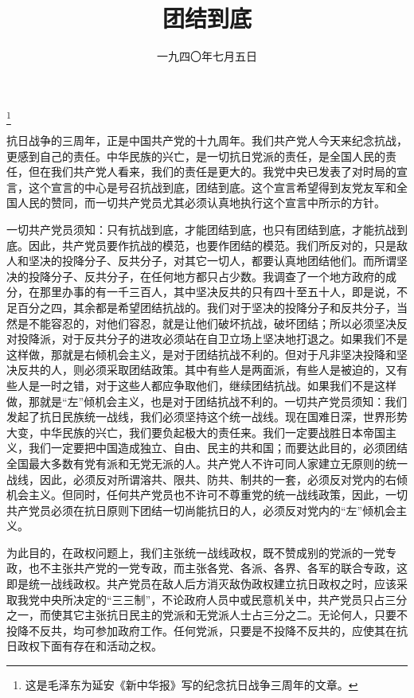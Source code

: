 
\title{团结到底}
\date{一九四〇年七月五日}
\thanks{这是毛泽东为延安《新中华报》写的纪念抗日战争三周年的文章。}
\maketitle


抗日战争的三周年，正是中国共产党的十九周年。我们共产党人今天来纪念抗战，更感到自己的责任。中华民族的兴亡，是一切抗日党派的责任，是全国人民的责任，但在我们共产党人看来，我们的责任是更大的。我党中央已发表了对时局的宣言，这个宣言的中心是号召抗战到底，团结到底。这个宣言希望得到友党友军和全国人民的赞同，而一切共产党员尤其必须认真地执行这个宣言中所示的方针。

一切共产党员须知：只有抗战到底，才能团结到底，也只有团结到底，才能抗战到底。因此，共产党员要作抗战的模范，也要作团结的模范。我们所反对的，只是敌人和坚决的投降分子、反共分子，对其它一切人，都要认真地团结他们。而所谓坚决的投降分子、反共分子，在任何地方都只占少数。我调查了一个地方政府的成分，在那里办事的有一千三百人，其中坚决反共的只有四十至五十人，即是说，不足百分之四，其余都是希望团结抗战的。我们对于坚决的投降分子和反共分子，当然是不能容忍的，对他们容忍，就是让他们破坏抗战，破坏团结；所以必须坚决反对投降派，对于反共分子的进攻必须站在自卫立场上坚决地打退之。如果我们不是这样做，那就是右倾机会主义，是对于团结抗战不利的。但对于凡非坚决投降和坚决反共的人，则必须采取团结政策。其中有些人是两面派，有些人是被迫的，又有些人是一时之错，对于这些人都应争取他们，继续团结抗战。如果我们不是这样做，那就是“左”倾机会主义，也是对于团结抗战不利的。一切共产党员须知：我们发起了抗日民族统一战线，我们必须坚持这个统一战线。现在国难日深，世界形势大变，中华民族的兴亡，我们要负起极大的责任来。我们一定要战胜日本帝国主义，我们一定要把中国造成独立、自由、民主的共和国；而要达此目的，必须团结全国最大多数有党有派和无党无派的人。共产党人不许可同人家建立无原则的统一战线，因此，必须反对所谓溶共、限共、防共、制共的一套，必须反对党内的右倾机会主义。但同时，任何共产党员也不许可不尊重党的统一战线政策，因此，一切共产党员必须在抗日原则下团结一切尚能抗日的人，必须反对党内的“左”倾机会主义。

为此目的，在政权问题上，我们主张统一战线政权，既不赞成别的党派的一党专政，也不主张共产党的一党专政，而主张各党、各派、各界、各军的联合专政，这即是统一战线政权。共产党员在敌人后方消灭敌伪政权建立抗日政权之时，应该采取我党中央所决定的“三三制”，不论政府人员中或民意机关中，共产党员只占三分之一，而使其它主张抗日民主的党派和无党派人士占三分之二。无论何人，只要不投降不反共，均可参加政府工作。任何党派，只要是不投降不反共的，应使其在抗日政权下面有存在和活动之权。


